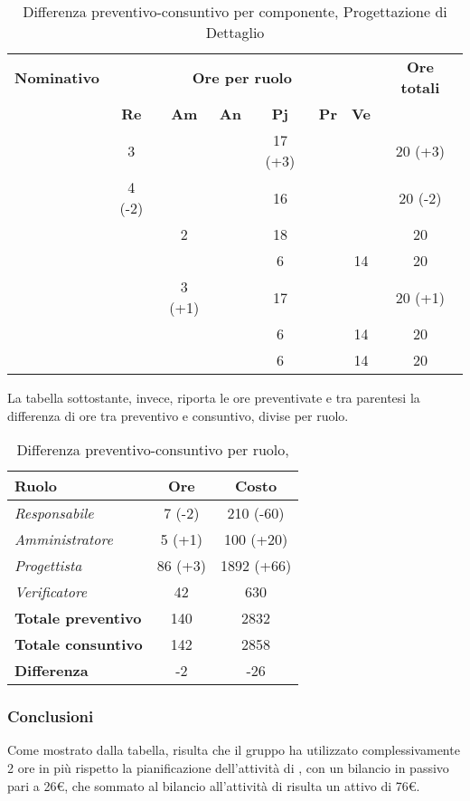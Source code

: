 \begin{table}[H]
	\begin{center}
		\begin{tabular}{|c|c|c|c|c|c|c|c|}
			\hline
			\textbf{Nominativo} & \multicolumn{6}{c|}{\textbf{Ore per ruolo}} & \textbf{Ore totali} \\
			& \textbf{Re} & \textbf{Am} & \textbf{An} & \textbf{Pj} & \textbf{Pr} & \textbf{Ve} & \\
			\hline
			\FB			&	3		&			&		&	17 (+3)	&		&		&	20 (+3)		\\
			\hline
			\AF			&	4 (-2)	&			&		&	16 		&		&		& 	20 (-2)		\\
			\hline
			\GN			&			&	2		&		&	18		&		&		&	20			\\
			\hline
			\GR			&			&	 		&		&	6		&	 	& 	14	&	20			\\
			\hline
			\SM 		&			&	3 (+1)	&		&	17		&		& 		&	20 (+1)		\\
			\hline
			\MP 		& 			&			&		&	6		&		&	14	&	20			\\
			\hline
			\MV 		&			&			&		&	6		&		&	14	& 	20			\\
			\hline
		\end{tabular}
	\end{center}
	\caption{Differenza preventivo-consuntivo per componente, Progettazione di Dettaglio}
\end{table}


La tabella sottostante, invece, riporta le ore preventivate e  tra parentesi la differenza di ore tra preventivo e consuntivo, divise per ruolo.

\begin{table}[H]
	\begin{center}
		\begin{tabular}{|l|c|c|}
			\hline
			\textbf{Ruolo}	& \textbf{Ore} & \textbf{Costo} \\
			\hline
			\textit{Responsabile}		&	7 (-2)	&	210 (-60) 		\\
			\hline
			\textit{Amministratore}		&	5 (+1)	&	100	(+20)		\\
			\hline
			\textit{Progettista}		&	86 (+3)	&	1892 (+66) 		\\
			\hline
			\textit{Verificatore}		&	42 		&	630 			\\
			\hline
			\textbf{Totale preventivo}	&	140		& 	2832			\\
			\hline
			\textbf{Totale consuntivo}	&	142		&  	2858			\\
			\hline
			\textbf{Differenza} 		&	-2		&	-26				\\
			\hline
		\end{tabular}
	\end{center}
	\caption{Differenza preventivo-consuntivo per ruolo, \PD}
\end{table}

\subsubsection{Conclusioni}
Come mostrato dalla tabella, risulta che il gruppo ha utilizzato complessivamente 2 ore in più rispetto la pianificazione dell'attività di \textit{\PD}, con un bilancio in passivo pari a 26€, che sommato al bilancio all'attività di \textit{\PA} risulta un attivo di 76€.
